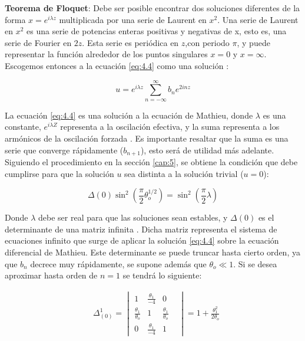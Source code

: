 \begin{teo}{\textbf{Teorema de Floquet}}\label{teo:4.1}:
Debe ser posible encontrar dos soluciones diferentes de la forma $x=e^{i\lambda z}$ multiplicada por una serie de Laurent en $x^2$. Una serie de Laurent en $x^2$ es una serie de potencias enteras positivas y negativas de x, esto es, una
serie de Fourier en $2z$. Esta serie es periódica en $z$,con periodo $\pi$, y puede representar la función alrededor de los puntos singulares $x = 0$ y $x = \infty$. Escogemos entonces a la ecuación \ref{eq:4.4} como una solución \cite{Philip}:

\begin{equation}\label{eq:4.4}
    u=e^{i\lambda z}\sum^{\infty}_{n=-\infty} b_n e^{2inz}
\end{equation}

\end{teo}

La ecuación \ref{eq:4.4} es una solución a la ecuación de Mathieu, donde $\lambda$ es una  constante, $e^{i\lambda Z}$ representa a la oscilación efectiva, y la suma representa a los armónicos de la oscilación forzada \cite{Phelps}.
Es importante resaltar que la suma es una serie que converge rápidamente ($b_{n+1}$), esto será de utilidad más adelante.
Siguiendo el procedimiento en la sección \ref{cap:5}, se obtiene la condición que debe cumplirse para que la solución $u$ sea distinta a la solución trivial ($u=0$):

\begin{equation}\label{eq:4.5}
\Delta(0)\sin^2(\frac{\pi}{2}\theta_o^{1/2})=\sin^2(\frac{\pi}{2}\lambda)
\end{equation}

Donde $\lambda$ debe ser real para que las soluciones sean estables, y $\Delta(0)$ es el determinante de una matriz infinita . Dicha matriz representa el sistema de ecuaciones infinito que surge de aplicar la solución \ref{eq:4.4} sobre la ecuación diferencial de Mathieu. Este determinante se puede truncar hasta cierto orden, ya que $b_n$ decrece muy rápidamente, se supone además que $\theta_o \ll 1$. Si se desea aproximar hasta orden de $n=1$ se tendrá lo siguiente:

\begin{equation}\label{eq:4.6}
\begin{aligned}
& \Delta_{(0)}^1=
\begin{vmatrix}
 1 & \frac{\theta_1}{-4} & 0 \\ 
\frac{\theta_1}{\theta_o} & 1 & \frac{\theta_1}{\theta_o}  \\
 0 & \frac{\theta_1}{-4} & 1 &  
\end{vmatrix}
= 1+\frac{\theta_1^2}{2\theta_o}
\end{aligned}
\end{equation}

